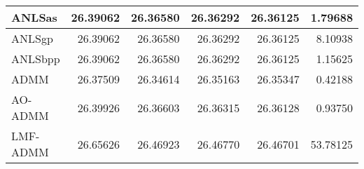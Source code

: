 \documentclass{article}
\begin{document}
\begin{table}[H]
\begin{tabular}{|l|r|r|r|r|r|}
 		ANLSas   & 26.39062                & 26.36580                & 26.36292                 & 26.36125                 & 1.79688                      \\ \hline
 		ANLSgp   & 26.39062                & 26.36580                & 26.36292                 & 26.36125                 & 8.10938                      \\ \hline
 		ANLSbpp  & 26.39062                & 26.36580                & 26.36292                 & 26.36125                 & 1.15625                      \\ \hline
 		ADMM     & 26.37509                & 26.34614                & 26.35163                 & 26.35347                 & 0.42188                      \\ \hline
 		AO-ADMM  & 26.39926                & 26.36603                & 26.36315                 & 26.36128                 & 0.93750                      \\ \hline
 		LMF-ADMM & 26.65626                & 26.46923                & 26.46770                 & 26.46701                 & 53.78125                     \\ \hline
 	\end{tabular}
 \end{table}
\end{document}
